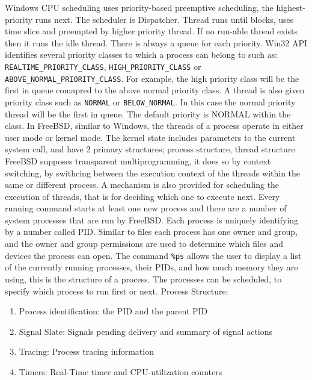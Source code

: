 \documentclass[letterpaper,10pt,draftclsnofoot,onecolumn]{IEEEtran}
\begin{document}
Windows CPU scheduling uses priority-based preemptive scheduling, the highest-priority runs next. The scheduler is Dispatcher. Thread runs until blocks, uses time slice and preempted by higher priority thread. If no run-able thread exists then it runs the idle thread. There is always a queue for each priority. Win32 API identifies several priority classes to which a process can belong to such as: \verb|REALTIME_PRIORITY_CLASS|, \verb|HIGH_PRIORITY_CLASS| or \verb|ABOVE_NORMAL_PRIORITY_CLASS|. For example, the high priority class will be the first in queue comapred to the above normal priority class. A thread is also given priority class such as \verb|NORMAL| or \verb|BELOW_NORMAL|. In this case the normal priority thread will be the first in queue. The default priority is NORMAL within the class.
In FreeBSD, similar to Windows, the threads of a process operate in either user mode or kernel mode. The kernel state includes parameters to the current system call, and have 2 primary structures; process structure, thread structure. FreeBSD supposes transparent multiprogramming, it does so by context switching, by swithcing between the execution context of the threads within the same or different process. A mechanism is also provided for scheduling the execution of threads, that is for deciding which one to execute next.
Every running command starts at least one new process and there are a number of system processes that are run by FreeBSD. Each process is uniquely identifying by a number called PID. Similar to files each process has one owner and group, and the owner and group permissions are used to determine which files and devices the process can open. The command \verb|%ps| allows the user to display a list of the currently running processes, their PIDs, and how much memory they are using, this is the structure of a process. The processes can be scheduled, to specify which process to run first or next.\cite{[2]}
Process Structure:
\begin{enumerate}
\item Process identification: the PID and the parent PID
\item Signal Slate: Signals pending delivery and summary of signal actions
\item Tracing: Process tracing information
\item Timers: Real-Time timer and CPU-utilization counters
\end{enumerate}
\end{document}
